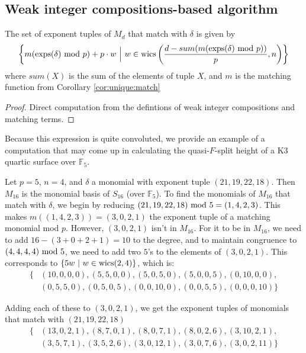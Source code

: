 \subsection{Weak integer compositions-based algorithm}

\begin{lem}
    \label{lem:generate:matching}
    The set of exponent tuples of \(M_{d}\) that match with $\delta$ is given by 
    \[
        \left\{ m(\operatorname{exps}(\delta) \text{ mod } p) + p\cdot w ~\Big|~ w \in \operatorname{wics} 
        \left(\frac{d - sum(m(\operatorname{exps}(\delta) \text{ mod } p))}{p}, n \right) \right\}
    \]
    where $sum(X)$ is the sum of the elements of tuple $X$, and $m$ is the matching function from Corollary \ref{cor:unique:match}
\end{lem}

\begin{proof}
    Direct computation from the defintions of weak integer compositions and matching terms.
\end{proof}


Because this expression is quite convoluted, we 
provide an example of a computation 
that may come up in calculating the quasi-\(F\)-split 
height of a K3 quartic surface over $\mathbb{F}_5$.

\begin{ex}
    Let $p = 5$, \(n = 4\), and $\delta$ a monomial 
    with exponent tuple $(21, 19, 22, 18)$. 
    Then $M_{16}$ is the monomial basis of 
    \(S_{16}\) (over $\mathbb{F}_5$). 
    To find the monomials of $M_{16}$ that match with 
    $\delta$, we begin by reducing $(21, 19, 22, 18) \text{ mod } 5 = (1, 4, 2, 3)$.
    This makes $m((1, 4, 2, 3)) = (3, 0, 2, 1)$ the 
    exponent tuple of a matching monomial mod \(p\).
    However, \((3, 0, 2, 1)\) isn't in $M_{16}$. 
    For it to be in $M_{16}$, we need to add $16 - (3 + 0 + 2 + 1) = 10$ 
    to the degree, and to maintain congruence to 
    $(4, 4, 4, 4) \text{ mod } 5$, we need to add two $5$'s 
    to the elements of $(3, 0, 2, 1)$. This corresponds 
    to $\{5w ~|~ w \in \operatorname{wics}(2, 4)\}$, which is:
    \begin{align*}
        \{&(10, 0, 0, 0), (5, 5, 0, 0), (5, 0, 5, 0), (5, 0, 0, 5), (0, 10, 0, 0), \\
        &(0, 5, 5, 0), (0, 5, 0, 5), (0, 0, 10, 0), (0, 0, 5, 5), (0, 0, 0, 10)\}
    \end{align*}
        
    \noindent Adding each of these to $(3, 0, 2, 1)$, we get the 
    exponent tuples of monomials that match with $(21, 19, 22, 18)$
    \begin{align*}
        \{&(13, 0, 2, 1), (8, 7, 0, 1), (8, 0, 7, 1), (8, 0, 2, 6), (3, 10, 2, 1), \\
        &(3, 5, 7, 1), (3, 5, 2, 6), (3, 0, 12, 1), (3, 0, 7, 6), (3, 0, 2, 11)\}
    \end{align*}    
\end{ex}

